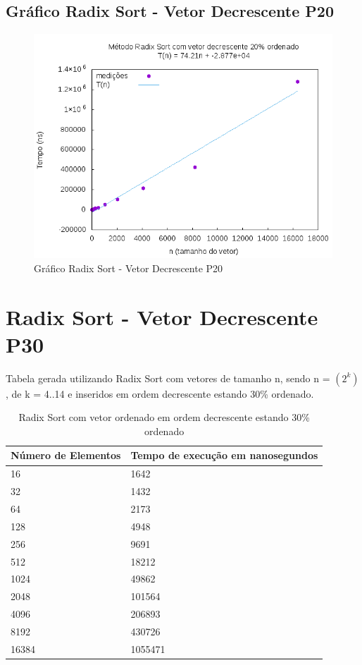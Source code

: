 \documentclass[12pt,a4paper,twoside]{report}
\begin{document}
\subsection{Gráfico Radix Sort - Vetor Decrescente P20}
\begin{figure}[H]
    \centering
    \includegraphics[width=0.7\linewidth]{graficos/RadixSort/vIntDecrescenteP20/vIntDecrescenteP20.png}
  \caption{Gráfico Radix Sort - Vetor Decrescente P20}
\end{figure}

\section{Radix Sort - Vetor Decrescente P30}
Tabela gerada utilizando Radix Sort com vetores de tamanho n, sendo n = $(2^k)$, de k = 4..14 e inseridos em ordem decrescente estando 30\% ordenado.
\begin{table}[H]
\centering
\caption{Radix Sort com vetor ordenado em ordem decrescente estando 30\% ordenado}
\label{my-label}
\begin{tabular}{|l|l|}
\hline
\multicolumn{1}{|c|}{\textbf{Número de Elementos}} & \multicolumn{1}{c|}{\textbf{Tempo de execução em nanosegundos}} \\ \hline
16 & 1642 \\ \hline
32 & 1432 \\ \hline
64 & 2173 \\ \hline
128 & 4948 \\ \hline
256 & 9691 \\ \hline
512 & 18212 \\ \hline
1024 & 49862 \\ \hline
2048 & 101564 \\ \hline
4096 & 206893 \\ \hline
8192 & 430726 \\ \hline
16384 & 1055471 \\ \hline
\end{tabular}
\end{table}
\end{document}
